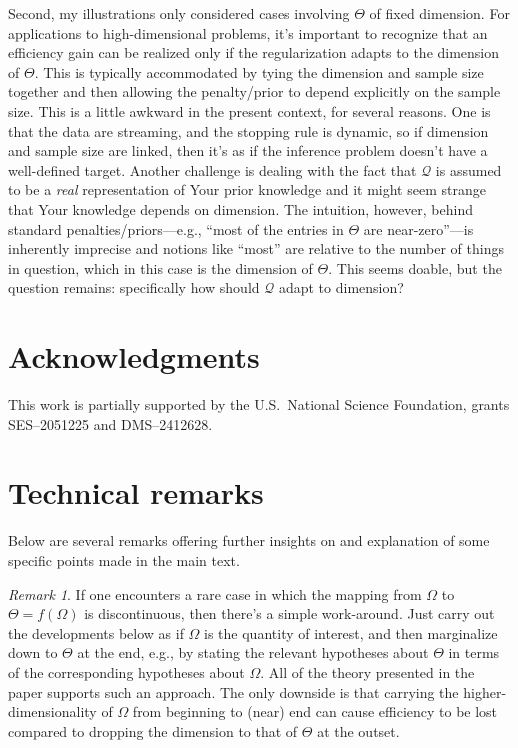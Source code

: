 \documentclass[a4paper, 12pt]{article}
\theoremstyle{plain}
\theoremstyle{definition}
\theoremstyle{remark}
\newtheorem{remark}{Remark}
\newcommand{\credal}{\mathscr{Q}}
\begin{document}
Second, my illustrations only considered cases involving $\Theta$ of fixed dimension.  For applications to high-dimensional problems, it's important to recognize that an efficiency gain can be realized only if the regularization adapts to the dimension of $\Theta$.  This is typically accommodated by tying the dimension and sample size together and then allowing the penalty/prior to depend explicitly on the sample size.  This is a little awkward in the present context, for several reasons.  One is that the data are streaming, and the stopping rule is dynamic, so if dimension and sample size are linked, then it's as if the inference problem doesn't have a well-defined target.  Another challenge is dealing with the fact that $\credal$ is assumed to be a {\em real} representation of Your prior knowledge and it might seem strange that Your knowledge depends on dimension.  The intuition, however, behind standard penalties/priors---e.g., ``most of the entries in $\Theta$ are near-zero''---is inherently imprecise and notions like ``most'' are relative to the number of things in question, which in this case is the dimension of $\Theta$.  This seems doable, but the question remains: specifically how should $\credal$ adapt to dimension? 


\section*{Acknowledgments}

This work is partially supported by the U.S.~National Science Foundation, grants SES--2051225 and DMS--2412628. 


%
%



\appendix


\section{Technical remarks}
\label{A:remarks}

Below are several remarks offering further insights on and explanation of some specific points made in the main text. 

\begin{remark}
\label{re:continuity}
If one encounters a rare case in which the mapping from $\Omega$ to $\Theta=f(\Omega)$ is discontinuous, then there's a simple work-around.  Just carry out the developments below as if $\Omega$ is the quantity of interest, and then marginalize down to $\Theta$ at the end, e.g., by stating the relevant hypotheses about $\Theta$ in terms of the corresponding hypotheses about $\Omega$.  All of the theory presented in the paper supports such an approach. The only downside is that carrying the higher-dimensionality of $\Omega$ from beginning to (near) end can cause efficiency to be lost compared to dropping the dimension to that of $\Theta$ at the outset. 
\end{remark}
\end{document}
